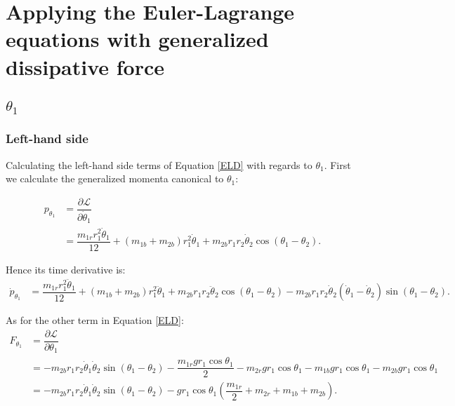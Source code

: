 \documentclass[12pt,a4paper,portrait]{article}
\begin{document}
	\section{Applying the Euler-Lagrange equations with generalized dissipative force}
	\subsection{$\theta_1$}
	\subsubsection{Left-hand side}
	Calculating the left-hand side terms of Equation \eqref{ELD} with regards to $\theta_1$. First we calculate the generalized momenta canonical to $\theta_1$:
	
	\begin{align*}
		p_{\theta_1} &= \dfrac{\partial \mathcal{L}}{\partial \dot{\theta}_1} \\
		&= \dfrac{m_{1r}r_1^2 \dot{\theta}_1}{12} + (m_{1b}+m_{2b}) r_1^2 \dot{\theta}_1 + m_{2b}r_1 r_2 \dot{\theta}_2 \cos{\left(\theta_1-\theta_2\right)}.
	\end{align*}
	
	Hence its time derivative is:
	\begin{align*}
		\dot{p}_{\theta_1} &= \dfrac{m_{1r} r_1^2 \ddot{\theta}_1}{12} + (m_{1b}+m_{2b})r_1^2 \ddot{\theta}_1 + m_{2b}r_1 r_2 \ddot{\theta}_2\cos{(\theta_1-\theta_2)} - m_{2b}r_1 r_2 \dot{\theta}_2\left(\dot{\theta}_1 - \dot{\theta}_2\right)\sin{(\theta_1-\theta_2)}.
	\end{align*}
	
	As for the other term in Equation \eqref{ELD}:
	\begin{align*}		
		F_{\theta_1} &= \dfrac{\partial \mathcal{L}}{\partial \theta_1} \\
		&= -m_{2b}r_1r_2\dot{\theta}_1\dot{\theta}_2 \sin{(\theta_1-\theta_2)} - \dfrac{m_{1r}gr_1 \cos{\theta_1}}{2} -m_{2r}gr_1 \cos{\theta_1} -m_{1b}gr_1 \cos{\theta_1} -m_{2b}gr_1 \cos{\theta_1} \\
		&= -m_{2b}r_1r_2\dot{\theta}_1\dot{\theta}_2 \sin{(\theta_1-\theta_2)} -gr_1\cos{\theta_1}\left(\dfrac{m_{1r}}{2}+m_{2r}+m_{1b} + m_{2b}\right).
	\end{align*}
	
\end{document}
